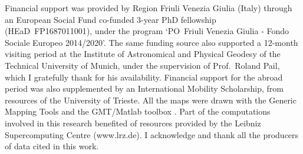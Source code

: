 Financial support was provided by Region Friuli Venezia Giulia (Italy) through an European Social Fund co-funded 3-year PhD fellowship ({HEaD}~{FP1687011001}), under the program `{{PO}~Friuli Venezia Giulia - Fondo Sociale Europeo 2014/2020}'.
The same funding source also supported a 12-month visiting period at the Institute of Astronomical and Physical Geodesy of the Technical University of Munich, under the supervision of Prof.~Roland Pail, which I gratefully thank for his availability.
Financial support for the abroad period was also supplemented by an International Mobility Scholarship, from resources of the University of Trieste.
All the maps were drawn with the Generic Mapping Tools \parencite[GMT,][]{GMT2013} and the {GMT/Matlab} toolbox \parencite{GMTmex2017}.
Part of the computations involved in this research benefited of resources provided by the Leibniz Supercomputing Centre (www.lrz.de).
I acknowledge and thank all the producers of data cited in this work.




